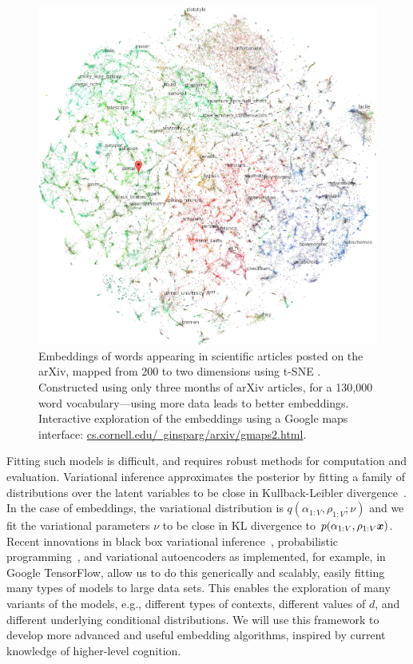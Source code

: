 \setlength{\columnsep}{20pt}
\begin{figure}
\centering
\includegraphics[width=.44\textwidth]{figs/ginsparg}
\caption{\small Embeddings of words appearing in scientific articles
posted on the arXiv, mapped from 200 to two dimensions using
t-SNE \citep{ginsparg}. Constructed using only three months of
arXiv articles, for a 130,000 word vocabulary---using more data
leads to better embeddings.
Interactive exploration of the embeddings
using a Google maps interface: \href{http://www.cs.cornell.edu/~ginsparg/arxiv/gmaps2.html}{cs.cornell.edu/~ginsparg/arxiv/gmaps2.html}.
}
    \label{fig:arxiv}
    \vskip2pt
\end{figure}

Fitting such models is difficult, and requires robust methods for
computation and evaluation.  Variational inference approximates the
posterior by fitting a family of distributions over the latent
variables to be close in Kullback-Leibler
divergence~\citep{Jordan:1999,Blei:2017}.  In the case of embeddings,
the variational distribution is $q(\alpha_{1:V}, \rho_{1:V} ; \nu)$
and we fit the variational parameters $\nu$ to be close in KL
divergence to $p(\alpha_{1:V}, \rho_{1:V} \g \mbx)$.  Recent
innovations in black box variational inference~\citep{Ranganath:2014},
probabilistic programming~\citep{Kucukelbir:2017,Tran:2017}, and
variational autoencoders
\citep{kingma} as implemented, for example, in Google TensorFlow, allow us to do this generically and
scalably, easily fitting many types of models to large
data sets.  This enables the exploration of many variants of the
models, e.g., different types of contexts, different values of $d$,
and different underlying conditional distributions. We will use
this framework to develop more advanced and useful embedding
algorithms, inspired by current knowledge of higher-level cognition.


